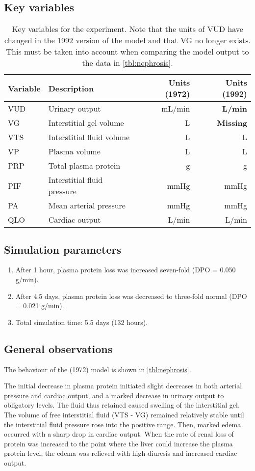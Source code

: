 \label{exp:nephrosis}

\subsection{Key variables}
\begin{table}[!h]
  \centering
  \begin{tabularx}{\textwidth}{lXrr}
    \toprule
    Variable & Description & Units (1972) & Units (1992) \\
    \midrule
    VUD & Urinary output & mL/min & \textbf{L/min} \\
    VG & Interstitial gel volume & L & \textbf{Missing} \\
    VTS & Interstitial fluid volume & L & L \\
    VP & Plasma volume & L & L \\
    PRP & Total plasma protein & g & g \\
    PIF & Interstitial fluid pressure & mmHg & mmHg \\
    PA & Mean arterial pressure & mmHg & mmHg \\
    QLO & Cardiac output & L/min & L/min \\
    \bottomrule
  \end{tabularx}
  \caption{Key variables for the experiment. Note that the units of VUD have changed in the 1992 version of the model and that VG no longer exists. This must be taken into account when comparing the model output to the data in \autoref{tbl:nephrosis}.}
\end{table}

\subsection{Simulation parameters}
\begin{enumerate}
  \item After 1 hour, plasma protein loss was increased seven-fold (DPO = 0.050 g/min).
  \item After 4.5 days, plasma protein loss was decreased to three-fold normal (DPO = 0.021 g/min).
  \item Total simulation time: 5.5 days (132 hours).
\end{enumerate}

\subsection{General observations}
The behaviour of the (1972) model is shown in \autoref{tbl:nephrosis}.

The initial decrease in plasma protein initiated slight decreases in both arterial pressure and cardiac output, and a marked decrease in urinary output to obligatory levels. The fluid thus retained caused swelling of the interstitial gel. The volume of free interstitial fluid (VTS - VG) remained relatively stable until the interstitial fluid pressure rose into the positive range. Then, marked edema occurred with a sharp drop in cardiac output. When the rate of renal loss of protein was increased to the point where the liver could increase the plasma protein level, the edema was relieved with high diuresis and increased cardiac output.
